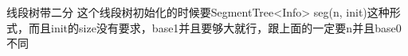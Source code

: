 线段树带二分
这个线段树初始化的时候要SegmentTree<Info> seg(n, init)这种形式，而且init的size没有要求，base1并且要够大就行，跟上面的一定要n并且base0不同